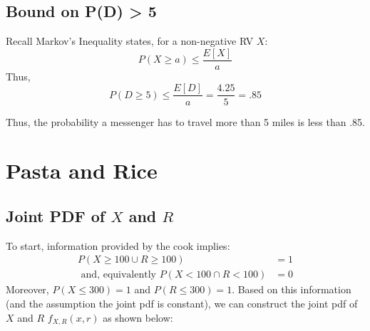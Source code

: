 \documentclass[paper=a4, fontsize=11pt]{scrartcl} %
\numberwithin{equation}{section} %
\numberwithin{figure}{section} %
\numberwithin{table}{section} %
\begin{document}
\subsection{Bound on P(D) > 5}

Recall Markov's Inequality states, for a non-negative RV $X$:
\begin{equation*}
P(X \geq a) \leq \frac{E[X]}{a}
\end{equation*}
Thus,
\begin{equation*}
P(D \geq 5) \leq \frac{E[D]}{a} = \frac{4.25}{5} = .85
\end{equation*}

Thus, the probability a messenger has to travel more than 5 miles is less than .85.


\section{Pasta and Rice}

\subsection{Joint PDF of $X$ and $R$}

To start, information provided by the cook implies:
\begin{align*}
P(X \geq 100 \cup R \geq 100) &= 1\\
\textrm{ and, equivalently } P(X < 100 \cap R < 100) &= 0
\end{align*}
Moreover, $P(X \leq 300) = 1$ and $P(R \leq 300) = 1$. Based on this information (and the assumption the joint pdf is constant), we can construct the joint pdf of $X$ and $R$ $f_{X,R}(x,r)$ as shown below:
\end{document}
